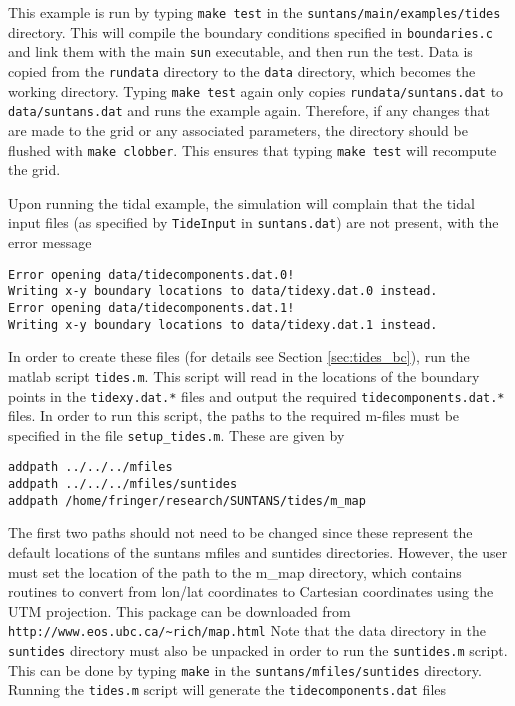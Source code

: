 This example is run by typing \verb+make test+ in the \verb+suntans/main/examples/tides+ directory.
This will compile the boundary conditions specified in \verb+boundaries.c+
and link them with the main \verb+sun+ executable, and then run the test.  Data is copied from
the \verb+rundata+ directory to the \verb+data+ directory, which becomes the working directory.  Typing
\verb+make test+ again only copies \verb+rundata/suntans.dat+ to \verb+data/suntans.dat+ and runs
the example again.  Therefore, if any changes that are made to the grid or any associated parameters,
the directory should be flushed with \verb+make clobber+.  This ensures that typing \verb+make test+ will
recompute the grid.   

Upon running the tidal example, the simulation will
complain that the tidal input files (as specified by \verb+TideInput+ in \verb+suntans.dat+)
are not present, with the error message
\begin{verbatim}
Error opening data/tidecomponents.dat.0!
Writing x-y boundary locations to data/tidexy.dat.0 instead.
Error opening data/tidecomponents.dat.1!
Writing x-y boundary locations to data/tidexy.dat.1 instead.
\end{verbatim}
In order to create these files (for details see Section \ref{sec:tides_bc}), run the matlab script
\verb+tides.m+.  This script will read in the locations of the boundary points
in the \verb+tidexy.dat.*+ files and output the required \verb+tidecomponents.dat.*+ files.  In order
to run this script, the paths to the required m-files must be specified in the file
\verb+setup_tides.m+. These are given by
\begin{verbatim}
addpath ../../../mfiles
addpath ../../../mfiles/suntides
addpath /home/fringer/research/SUNTANS/tides/m_map
\end{verbatim}
The first two paths should not need to be changed since these represent the default locations of
the suntans mfiles and suntides directories.  However, the user must set the location of the path to
the m\_map directory, which contains routines to convert from lon/lat coordinates to Cartesian coordinates
using the UTM projection.  This package can be downloaded from\\
\verb+http://www.eos.ubc.ca/~rich/map.html+
Note that the data directory in the \verb+suntides+ directory must also be unpacked in order to run
the \verb+suntides.m+ script.  This can be done by typing \verb+make+ in the \verb+suntans/mfiles/suntides+ directory.
Running the \verb+tides.m+ script will generate the \verb+tidecomponents.dat+ files

